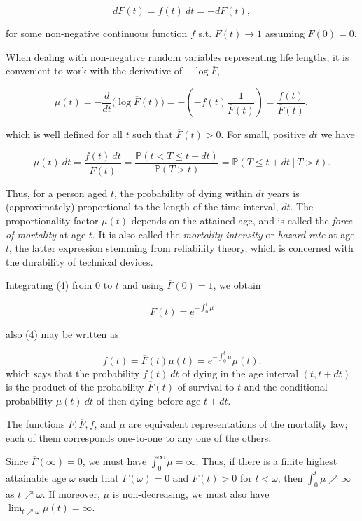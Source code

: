 \documentclass[a4paper,10pt,openany]{book}
\begin{document}
\[
dF(t)=f(t)\ dt=-d\overline F(t),\tag{3}
\]

for some non-negative continuous function \(f\) s.t. \(F(t)\to 1\) assuming \(F(0)=0\).

When dealing with non-negative random variables representing life lengths, it is convenient to work with the derivative of \(-\log \overline F\),

\[
\mu(t)=-\frac{d}{dt}\Big(\log \overline F(t)\Big)=-\left(-f(t)\frac{1}{\overline F(t)}\right)=\frac{f(t)}{\overline F(t)},\tag{4}
\]

which is well defined for all \(t\) such that \(\overline F(t) > 0\). For small, positive \(dt\) we have

\[
\mu(t)\ dt=\frac{f(t)\ dt}{\overline F(t)}=\frac{\mathbb P(t< T\le t+dt)}{\mathbb P(T> t)}=\mathbb P(T\le t+dt\ \vert\ T> t).\tag{5}
\]

Thus, for a person aged \(t\), the probability of dying within \(dt\) years is (approximately) proportional to the length of the time interval, \(dt\). The proportionality factor \(\mu (t)\) depends on the attained age, and is called the \emph{force of mortality} at age \(t\). It is also called the \emph{mortality intensity} or \emph{hazard rate} at age \(t\), the latter expression stemming from reliability theory, which is concerned with the durability of technical devices.

Integrating (4) from 0 to \(t\) and using \(\overline F(0) = 1\), we obtain

\[
\overline F(t)=e^{-\int_0^t\mu}\tag{6}
\]

also (4) may be written as

\[
f(t)=\overline F(t)\mu(t)=e^{-\int_0^t\mu}\mu(t).\tag{7}
\]
which says that the probability \(f (t)\ dt\) of dying in the age interval \((t, t + dt)\) is the product of the probability \(\overline F(t)\) of survival to \(t\) and the conditional probability \(\mu(t)\ dt\) of then dying before age \(t + dt\).

The functions \(F,\overline F, f\), and \(\mu\) are equivalent representations of the mortality law; each of them corresponds one-to-one to any one of the others.

Since \(\overline F(\infty) = 0\), we must have \(\int_0^\infty \mu=\infty\). Thus, if there is a finite highest attainable age \(\omega\) such that \(\overline F(\omega) = 0\) and \(\overline F(t) > 0\) for \(t < \omega\), then \(\int_0^t\mu\nearrow\infty\) as \(t\nearrow \omega\). If moreover, \(\mu\) is non-decreasing, we must also have \(\lim_{t\nearrow \omega}\mu(t)=\infty\).
\end{document}

